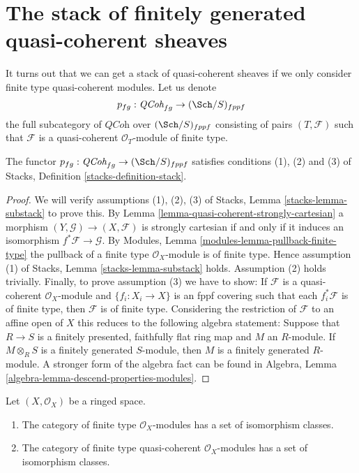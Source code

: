 \section{The stack of finitely generated quasi-coherent sheaves}
\label{section-stack-of-finitely-generated-quasi-coherent-sheaves}

\noindent
It turns out that we can get a stack of quasi-coherent sheaves
if we only consider finite type quasi-coherent modules.
Let us denote
$$
p_{fg} : \textit{QCoh}_{fg} \to (\Sch/S)_{fppf}
$$
the full subcategory of $\textit{QCoh}$ over $(\Sch/S)_{fppf}$
consisting of pairs $(T, \mathcal{F})$ such that $\mathcal{F}$
is a quasi-coherent $\mathcal{O}_T$-module of finite type.

\begin{lemma}
\label{lemma-stack-of-finite-type-quasi-coherent-sheaves}
The functor $p_{fg} : \textit{QCoh}_{fg} \to (\Sch/S)_{fppf}$
satisfies conditions (1), (2) and (3) of
Stacks, Definition \ref{stacks-definition-stack}.
\end{lemma}

\begin{proof}
We will verify assumptions (1), (2), (3) of
Stacks, Lemma \ref{stacks-lemma-substack}
to prove this. By
Lemma \ref{lemma-quasi-coherent-strongly-cartesian}
a morphism $(Y, \mathcal{G}) \to (X, \mathcal{F})$ is
strongly cartesian if and only if it induces an isomorphism
$f^*\mathcal{F} \to \mathcal{G}$. By
Modules, Lemma \ref{modules-lemma-pullback-finite-type}
the pullback of a finite type $\mathcal{O}_X$-module is of finite
type. Hence assumption (1) of
Stacks, Lemma \ref{stacks-lemma-substack}
holds. Assumption (2) holds trivially.
Finally, to prove assumption (3) we have to show:
If $\mathcal{F}$ is a quasi-coherent $\mathcal{O}_X$-module
and $\{f_i : X_i \to X\}$ is an fppf covering such that each
$f_i^*\mathcal{F}$ is of finite type, then $\mathcal{F}$ is of
finite type. Considering the restriction of $\mathcal{F}$ to
an affine open of $X$ this reduces to the following algebra statement:
Suppose that $R \to S$ is a finitely presented, faithfully flat ring map
and $M$ an $R$-module. If $M \otimes_R S$ is a finitely generated
$S$-module, then $M$ is a finitely generated $R$-module.
A stronger form of the algebra fact can be found in
Algebra, Lemma \ref{algebra-lemma-descend-properties-modules}.
\end{proof}

\begin{lemma}
\label{lemma-finite-type}
Let $(X, \mathcal{O}_X)$ be a ringed space.
\begin{enumerate}
\item The category of finite type $\mathcal{O}_X$-modules has a
set of isomorphism classes.
\item The category of finite type quasi-coherent
$\mathcal{O}_X$-modules has a set of isomorphism classes.
\end{enumerate}
\end{lemma}

